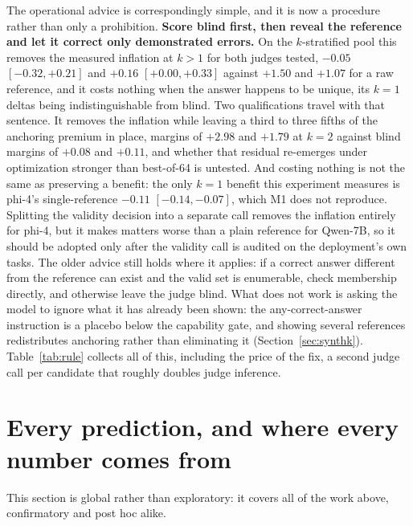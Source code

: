\documentclass[11pt]{article}
\begin{document}
The operational advice is correspondingly simple, and it is now a procedure rather than only a prohibition.
\textbf{Score blind first, then reveal the reference and let it correct only demonstrated errors.}
On the $k$-stratified pool this removes the measured inflation at $k > 1$ for both judges tested, $-0.05$ $[-0.32, +0.21]$ and $+0.16$ $[+0.00, +0.33]$ against $+1.50$ and $+1.07$ for a raw reference, and it costs nothing when the answer happens to be unique, its $k{=}1$ deltas being indistinguishable from blind.
Two qualifications travel with that sentence.
It removes the inflation while leaving a third to three fifths of the anchoring premium in place, margins of $+2.98$ and $+1.79$ at $k{=}2$ against blind margins of $+0.08$ and $+0.11$, and whether that residual re-emerges under optimization stronger than best-of-64 is untested.
And costing nothing is not the same as preserving a benefit: the only $k{=}1$ benefit this experiment measures is phi-4's single-reference $-0.11$ $[-0.14, -0.07]$, which M1 does not reproduce.
Splitting the validity decision into a separate call removes the inflation entirely for phi-4, but it makes matters worse than a plain reference for Qwen-7B, so it should be adopted only after the validity call is audited on the deployment's own tasks.
The older advice still holds where it applies: if a correct answer different from the reference can exist and the valid set is enumerable, check membership directly, and otherwise leave the judge blind.
What does not work is asking the model to ignore what it has already been shown: the any-correct-answer instruction is a placebo below the capability gate, and showing several references redistributes anchoring rather than eliminating it (Section~\ref{sec:synthk}).
Table~\ref{tab:rule} collects all of this, including the price of the fix, a second judge call per candidate that roughly doubles judge inference.

\FloatBarrier
\section{Every prediction, and where every number comes from}
\label{sec:ledger}
This section is global rather than exploratory: it covers all of the work above, confirmatory and post hoc alike.
\end{document}
